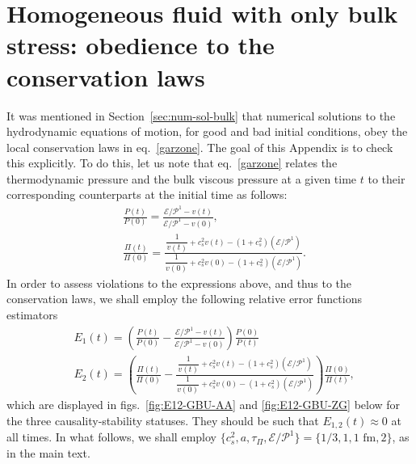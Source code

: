 \documentclass[aps, prd, showkeys,superscriptaddress, nofootinbib,floatfix]{revtex4-2}
\begin{document}
\appendix


\section{Homogeneous fluid with only bulk stress: obedience to the conservation laws}
\label{sec:hom-fluid-obed}



It was mentioned in Section~\ref{sec:num-sol-bulk} that numerical solutions to the hydrodynamic equations of motion, for good and bad initial conditions, obey the local conservation laws in eq.~\eqref{garzone}. The goal of this Appendix is to check this explicitly. To do this, let us note that eq.~\eqref{garzone} relates the thermodynamic pressure and the bulk viscous pressure at a given time $t$ to their corresponding counterparts at the initial time as follows:
%
\begin{equation}
\begin{aligned}
&
\frac{P(t)}{P(0)} = \frac{\mathcal{E}/\mathcal{P}^1- v(t)}{\mathcal{E}/\mathcal{P}^1- v(0)},
\\
&
\frac{\Pi(t)}{\Pi(0)} 
=
\frac{\dfrac{1}{v(t)}+ c_s^2 v(t) -(1{+}c_s^2)(\mathcal{E}/\mathcal{P}^1)}{\dfrac{1}{v(0)}+ c_s^2 v(0) -(1{+}c_s^2)(\mathcal{E}/\mathcal{P}^1)}.
\end{aligned}    
\end{equation}
%
In order to assess violations to the expressions above, and thus to the conservation laws, we shall employ the following relative error functions estimators
%
\begin{subequations}
\begin{align}
&
\label{eq:e1}
E_{1}(t) = \left( 
\frac{P(t)}{P(0)} - \frac{\mathcal{E}/\mathcal{P}^1- v(t)}{\mathcal{E}/\mathcal{P}^1- v(0)}
\right)\frac{P(0)}{P(t)}
\\
&
\label{eq:e2}
E_{2}(t) = \left( \frac{\Pi(t)}{\Pi(0)} 
-
\frac{\dfrac{1}{v(t)}+ c_s^2 v(t) -(1{+}c_s^2)(\mathcal{E}/\mathcal{P}^1)}{\dfrac{1}{v(0)}+ c_s^2 v(0) -(1{+}c_s^2)(\mathcal{E}/\mathcal{P}^1)}
\right) \frac{\Pi(0)}{\Pi(t)},
\end{align}    
\end{subequations}
%
which are displayed in figs.~\ref{fig:E12-GBU-AA} and \ref{fig:E12-GBU-ZG} below for the three causality-stability statuses. They should be such that $E_{1,2}(t) \approx 0$ at all times. In what follows, we shall employ $\{c_s^2,a,\tau_\Pi,\mathcal{E}/\mathcal{P}^1 \}=\{1/3,1,1 \text{ fm},2 \}$, as in the main text. 
\end{document}
